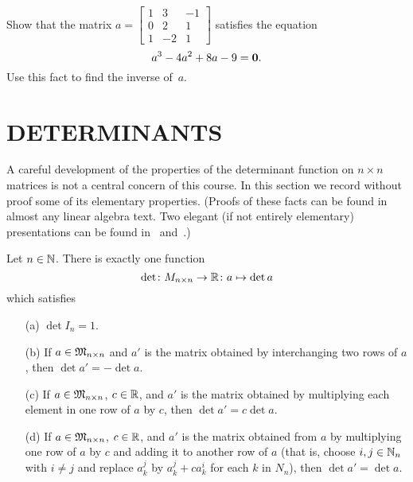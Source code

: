 \begin{prob}\label{prob_matr_inv}  Show that the matrix $a =
          \begin{bmatrix}
                  1 &  3 & -1 \\
                  0 &  2 &  1 \\
                  1 & -2 &  1
          \end{bmatrix}$ satisfies the equation
  \[ a^3 - 4a^2 + 8a - 9 = \mathbf{0}. \]
Use this fact to find the inverse of~$a$.
\end{prob}











\section{DETERMINANTS}\label{dets} A careful development of the properties of the determinant
function on $n \times n$ matrices is not a central concern of this course.  In this section we
record without proof some of its elementary properties. (Proofs of these facts can be found in
almost any linear algebra text. Two elegant (if not entirely elementary) presentations can be
found in~\cite{Halmos:1958} and~\cite{HoffmanK:1971}.)

\begin{fact}\label{mat_fact1} Let $n \in \mathbb{N}$.  There is exactly one function
 \[ \det \colon  M_{n \times n} \rightarrow \mathbb{R} \colon  a \mapsto \det a \]
which satisfies
 \begin{enumerate}
  \item[(a)] $\det I_n = 1$.
  \item[(b)] If $a \in \mathfrak{M}_{n \times n}$ and $a'$ is the matrix obtained by interchanging two
rows of $a$, then $\det a' = - \det a$.
  \item[(c)] If $a \in \mathfrak{M}_{n \times n}$, $c \in \mathbb{R}$, and $a'$ is the matrix obtained by
multiplying each element in one row of $a$ by $c$, then $\det a' = c \det a$.
  \item[(d)] If $a \in \mathfrak{M}_{n \times n}$, $c \in \mathbb{R}$, and $a'$ is the matrix obtained from $a$
by multiplying one row of $a$ by $c$ and adding it to another row of $a$ (that is, choose $i,j
\in \mathbb{N}_n$ with $i \ne j$ and replace $a_k^j$ by $a_k^j + ca_k^i$ for each $k$ in $N_n$), then
$\det a' = \det a$.
 \end{enumerate}
\end{fact}

